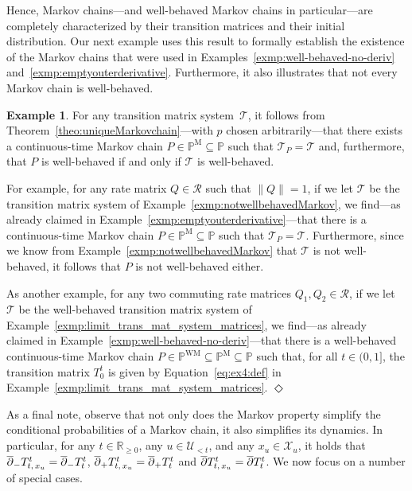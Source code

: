 \documentclass[10pt,a4paper]{paper}
\theoremstyle{definition}
\newtheorem{exmp}{Example}%
\newcommand{\reals}{\mathbb{R}}
\newcommand{\realsnonneg}{\reals_{\geq 0}}
\newcommand{\states}{\mathcal{X}}
\newcommand{\processes}{\mathbb{P}}
\newcommand{\mprocesses}{\processes^{\mathrm{M}}}
\newcommand{\wmprocesses}{\processes^{\mathrm{WM}}}
\newcommand{\norm}[1]{\left\lVert #1 \right\rVert}
\newcommand{\exampleend}{\hfill$\Diamond$}
\begin{document}
Hence, Markov chains---and well-behaved Markov chains in particular---are completely characterized by their transition matrices and their initial distribution. Our next example uses this result to formally establish the existence of the Markov chains that were used in Examples~\ref{exmp:well-behaved-no-deriv} and~\ref{exmp:emptyouterderivative}. Furthermore, it also illustrates that not every Markov chain is well-behaved.

\begin{exmp}\label{exmp:twoexamplesofMarkovchains}
For any transition matrix system~$\mathcal{T}$, it follows from Theorem~\ref{theo:uniqueMarkovchain}---with $p$ chosen arbitrarily---that there exists a continuous-time Markov chain $P\in\mprocesses\subseteq\processes$ such that $\mathcal{T}_P=\mathcal{T}$ and, furthermore, that $P$ is well-behaved if and only if $\mathcal{T}$ is well-behaved.

For example, for any rate matrix $Q\in\mathcal{R}$ such that $\norm{Q}=1$, if we let $\mathcal{T}$ be the transition matrix system of Example~\ref{exmp:notwellbehavedMarkov}, we find---as already claimed in Example~\ref{exmp:emptyouterderivative}---that there is a continuous-time Markov chain $P\in\mprocesses\subseteq\processes$ such that $\mathcal{T}_P=\mathcal{T}$. Furthermore, since we know from Example~\ref{exmp:notwellbehavedMarkov} that $\mathcal{T}$ is not well-behaved, it follows that $P$ is not well-behaved either.

As another example, for any two commuting rate matrices $Q_1,Q_2\in\mathcal{R}$, if we let $\mathcal{T}$ be the well-behaved transition matrix system of Example~\ref{exmp:limit_trans_mat_system_matrices}, we find---as already claimed in Example~\ref{exmp:well-behaved-no-deriv}---that there is a well-behaved continuous-time Markov chain $P\in\wmprocesses\subseteq\mprocesses\subseteq\processes$ such that, for all $t\in(0,1]$, the transition matrix $T_0^t$ is given by Equation~\eqref{eq:ex4:def} in Example~\ref{exmp:limit_trans_mat_system_matrices}.
\exampleend
\end{exmp}

As a final note, observe that not only does the Markov property simplify the conditional probabilities of a Markov chain, it also simplifies its dynamics. In particular, for any $t\in\realsnonneg$, any $u\in\mathcal{U}_{<t}$, and any $x_u\in\states_u$, it holds that $\smash{\overline{\partial}_-}T_{t,\,x_u}^t=\smash{\overline{\partial}_-}T_{t}^t$, $\smash{\overline{\partial}_+}T_{t,\,x_u}^t=\smash{\overline{\partial}_+}T_{t}^t$ and $\smash{\overline{\partial}}T_{t,\,x_u}^t=\smash{\overline{\partial}}T_{t}^t$. We now focus on a number of special cases.
\end{document}
